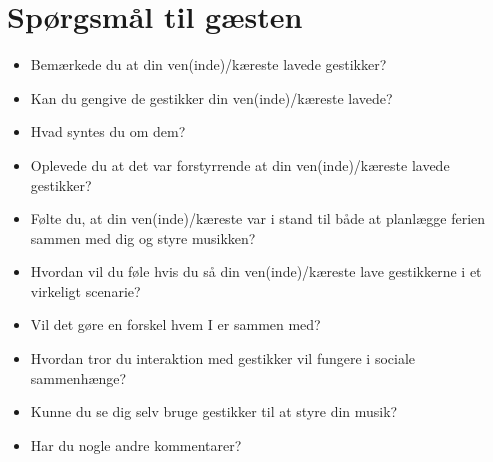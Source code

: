 \section{Spørgsmål til gæsten}
\label{app:ExitInterviewGaest}
%
\begin{itemize}
  \item Bemærkede du at din ven(inde)/kæreste lavede gestikker? 
  \item Kan du gengive de gestikker din ven(inde)/kæreste lavede?
  \item Hvad syntes du om dem? 
  \item Oplevede du at det var forstyrrende at din ven(inde)/kæreste lavede gestikker? 
  \item Følte du, at din ven(inde)/kæreste var i stand til både at planlægge ferien sammen med dig og styre musikken?
  \item Hvordan vil du føle hvis du så din ven(inde)/kæreste lave gestikkerne i et virkeligt scenarie?
  \item Vil det gøre en forskel hvem I er sammen med?
  \item Hvordan tror du interaktion med gestikker vil fungere i sociale sammenhænge? 
  \item Kunne du se dig selv bruge gestikker til at styre din musik?
  \item Har du nogle andre kommentarer?
\end{itemize}



 